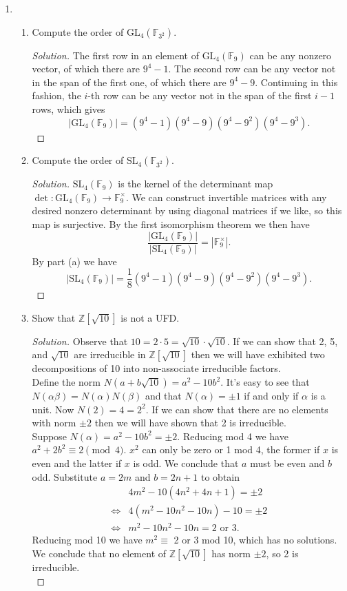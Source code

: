 \documentclass[11pt,letterpaper]{report}
\newcommand{\integers}{\mathbb{Z}}
\newcommand{\field}{\mathbb{F}}
\newcommand{\GL}{\text{GL}}
\newcommand{\SL}{\text{SL}}
\newenvironment{solution}
{\begin{proof}[Solution]}
{\end{proof}}
\begin{document}
\begin{enumerate}
	\item \begin{enumerate}
		\item Compute the order of $\text{GL}_4(\mathbb{F}_{3^2})$.
		\begin{solution}
			The first row in an element of $\GL_4(\field_9)$ can be any nonzero vector, of which there are $9^4-1$. The second row can be any vector not in the span of the first one, of which there are $9^4-9$. Continuing in this fashion, the $i$-th row can be any vector not in the span of the first $i-1$ rows, which gives
			\[
			|\GL_4(\field_9)| = (9^4-1)(9^4-9)(9^4-9^2)(9^4-9^3).
			\]
		\end{solution}
		\item Compute the order of $\text{SL}_4(\mathbb{F}_{3^2})$.
		\begin{solution}
			$\SL_4(\field_9)$ is the kernel of the determinant map $\det: \GL_4(\field_9)\to \field_9^\times$. We can construct invertible matrices with any desired nonzero determinant by using diagonal matrices if we like, so this map is surjective. By the first isomorphism theorem we then have
			\[
			\frac{|\GL_4(\field_9)|}{|\SL_4(\field_9)|} = |\field_9^\times|.
			\]
			By part (a) we have
			\[
			|\SL_4(\field_9)| = \frac{1}{8}(9^4-1)(9^4-9)(9^4-9^2)(9^4-9^3).
			\]
		\end{solution}
		\item Show that $\integers[\sqrt{10}]$ is not a UFD.
		\begin{solution}
			Observe that $10 = 2\cdot 5 = \sqrt{10}\cdot \sqrt{10}$. If we can show that 2, 5, and $\sqrt{10}$ are irreducible in $\integers[\sqrt{10}]$ then we will have exhibited two decompositions of 10 into non-associate irreducible factors.\\

			\noindent Define the norm $N(a+b\sqrt{10}) = a^2-10b^2$. It's easy to see that $N(\alpha\beta) = N(\alpha)N(\beta)$ and that $N(\alpha) = \pm 1$ if and only if $\alpha$ is a unit. Now $N(2) = 4=2^2$. If we can show that there are no elements with norm $\pm 2$ then we will have shown that 2 is irreducible.\\

			\noindent Suppose $N(\alpha) = a^2-10b^2 = \pm 2$. Reducing mod 4 we have $a^2 + 2b^2\equiv 2\pmod{4}$. $x^2$ can only be zero or 1 mod 4, the former if $x$ is even and the latter if $x$ is odd. We conclude that $a$ must be even and $b$ odd. Substitute $a=2m$ and $b = 2n+1$ to obtain 
			\begin{align*}
				&4m^2-10(4n^2+4n+1) = \pm 2\\
				\iff & 4(m^2-10n^2-10n)-10 = \pm 2\\
				\iff & m^2-10n^2-10n = 2\text{ or }3.
			\end{align*}
			Reducing mod 10 we have $m^2 \equiv$ 2 or 3 mod 10, which has no solutions. We conclude that no element of $\integers[\sqrt{10}]$ has norm $\pm 2$, so 2 is irreducible.\\


\end{solution}
\end{enumerate}
\end{enumerate}
\end{document}

